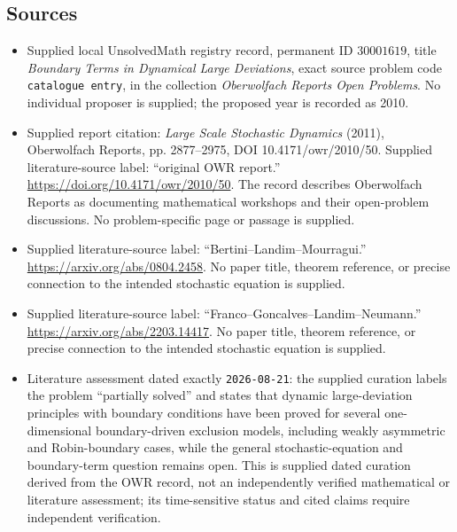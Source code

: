 \documentclass[11pt]{article}
\begin{document}
\subsection{Sources}
\begin{itemize}
\item Supplied local UnsolvedMath registry record, permanent ID \(30001619\), title \emph{Boundary Terms in Dynamical Large Deviations}, exact source problem code \texttt{catalogue entry}, in the collection \emph{Oberwolfach Reports Open Problems}. No individual proposer is supplied; the proposed year is recorded as 2010.
\item Supplied report citation: \emph{Large Scale Stochastic Dynamics} (2011), Oberwolfach Reports, pp. 2877--2975, DOI 10.4171/owr/2010/50. Supplied literature-source label: ``original OWR report.'' \url{https://doi.org/10.4171/owr/2010/50}. The record describes Oberwolfach Reports as documenting mathematical workshops and their open-problem discussions. No problem-specific page or passage is supplied.
\item Supplied literature-source label: ``Bertini--Landim--Mourragui.'' \url{https://arxiv.org/abs/0804.2458}. No paper title, theorem reference, or precise connection to the intended stochastic equation is supplied.
\item Supplied literature-source label: ``Franco--Goncalves--Landim--Neumann.'' \url{https://arxiv.org/abs/2203.14417}. No paper title, theorem reference, or precise connection to the intended stochastic equation is supplied.
\item Literature assessment dated exactly \texttt{2026-08-21}: the supplied curation labels the problem ``partially solved'' and states that dynamic large-deviation principles with boundary conditions have been proved for several one-dimensional boundary-driven exclusion models, including weakly asymmetric and Robin-boundary cases, while the general stochastic-equation and boundary-term question remains open. This is supplied dated curation derived from the OWR record, not an independently verified mathematical or literature assessment; its time-sensitive status and cited claims require independent verification.
\end{itemize}
\end{document}
